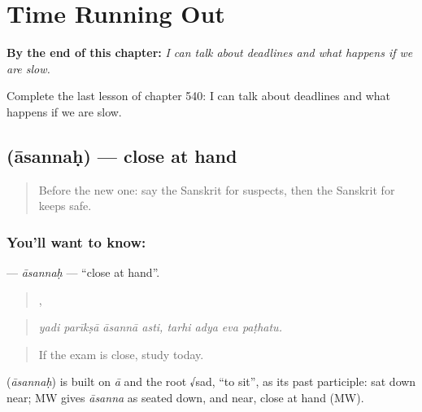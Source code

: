 
\chapter{Time Running Out}
\label{ch:sa-time-running-out}

\begin{chapteropening}
\textbf{By the end of this chapter:} \emph{I can talk about deadlines and what happens if we are slow.}

Complete the last lesson of chapter 540: I can talk about deadlines and what happens if we are slow.
\end{chapteropening}

\section[\texorpdfstring{\sk{आसन्नः} (āsannaḥ)}{आसन्नः (āsannaḥ)}]{ (āsannaḥ) — close at hand}

\label{lesson:SA-C540-asannah}



\begin{quote}
Before the new one: say the Sanskrit for suspects, then the Sanskrit for keeps safe.
\end{quote}

\subsection*{You'll want to know: }
\textbf{} — \emph{āsannaḥ} — \textquotedblleft{}close at hand\textquotedblright{}.

\begin{quote}
   ,    
\end{quote}

\begin{quote}
\emph{yadi parīkṣā āsannā asti, tarhi adya eva paṭhatu.}
\end{quote}

\begin{quote}
If the exam is close, study today.
\end{quote}

\begin{cousinweb}
\textbf{} (\emph{āsannaḥ}) is built on \emph{ā} and the root √sad, \textquotedblleft{}to sit\textquotedblright{}, as its past participle: sat down near; MW gives \emph{āsanna} as seated down, and near, close at hand (MW).
\end{cousinweb}


